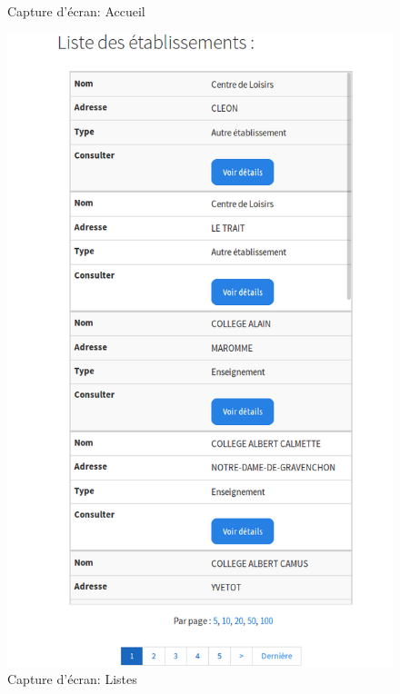 \begin{frame}
\begin{multicols}{2}
\begin{figure}[!h]
\begin{center}
				\caption{Capture d'écran: Accueil}
			\end{center}
		\end{figure}
		\begin{figure}[!h]
			\begin{center}
				\includegraphics[scale=0.16]{images/screenshot2.png}
				\caption{Capture d'écran: Listes }
			\end{center}
		\end{figure}
	\end{multicols}

\end{frame}

